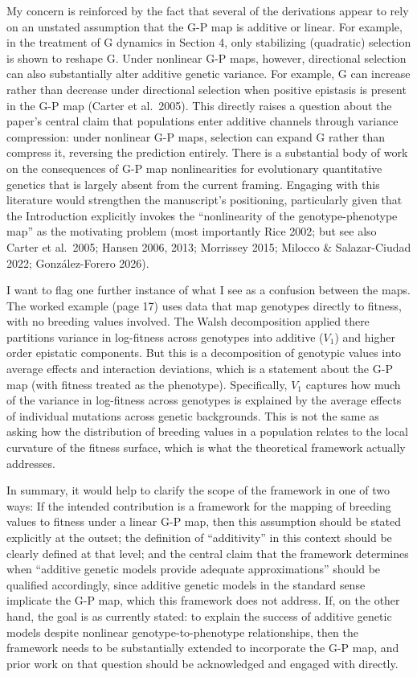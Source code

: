 \documentclass[11pt,a4paper]{article}
\begin{document}
\begin{revquote}
My concern is reinforced by the fact that several of the derivations appear to rely on an unstated assumption that the G-P map is additive or linear. For example, in the treatment of G dynamics in Section 4, only stabilizing (quadratic) selection is shown to reshape G. Under nonlinear G-P maps, however, directional selection can also substantially alter additive genetic variance. For example, G can increase rather than decrease under directional selection when positive epistasis is present in the G-P map (Carter et al.\ 2005). This directly raises a question about the paper's central claim that populations enter additive channels through variance compression: under nonlinear G-P maps, selection can expand G rather than compress it, reversing the prediction entirely. There is a substantial body of work on the consequences of G-P map nonlinearities for evolutionary quantitative genetics that is largely absent from the current framing. Engaging with this literature would strengthen the manuscript's positioning, particularly given that the Introduction explicitly invokes the ``nonlinearity of the genotype-phenotype map'' as the motivating problem (most importantly Rice 2002; but see also Carter et al.\ 2005; Hansen 2006, 2013; Morrissey 2015; Milocco \& Salazar-Ciudad 2022; González-Forero 2026).

I want to flag one further instance of what I see as a confusion between the maps. The worked example (page 17) uses data that map genotypes directly to fitness, with no breeding values involved. The Walsh decomposition applied there partitions variance in log-fitness across genotypes into additive ($V_1$) and higher order epistatic components. But this is a decomposition of genotypic values into average effects and interaction deviations, which is a statement about the G-P map (with fitness treated as the phenotype). Specifically, $V_1$ captures how much of the variance in log-fitness across genotypes is explained by the average effects of individual mutations across genetic backgrounds. This is not the same as asking how the distribution of breeding values in a population relates to the local curvature of the fitness surface, which is what the theoretical framework actually addresses.

In summary, it would help to clarify the scope of the framework in one of two ways: If the intended contribution is a framework for the mapping of breeding values to fitness under a linear G-P map, then this assumption should be stated explicitly at the outset; the definition of ``additivity'' in this context should be clearly defined at that level; and the central claim that the framework determines when ``additive genetic models provide adequate approximations'' should be qualified accordingly, since additive genetic models in the standard sense implicate the G-P map, which this framework does not address. If, on the other hand, the goal is as currently stated: to explain the success of additive genetic models despite nonlinear genotype-to-phenotype relationships, then the framework needs to be substantially extended to incorporate the G-P map, and prior work on that question should be acknowledged and engaged with directly.
\end{revquote}
\end{document}
